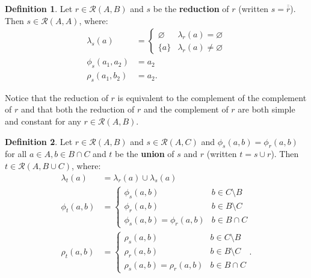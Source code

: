 \documentclass{article}
\theoremstyle{definition}
\newtheorem{definition}{Definition}[subsection]
\theoremstyle{plain}
\def\rule{\mathcal{R}}
\begin{document}
\begin{definition}
  Let $ r \in \rule (A, B) $
  and $ s $ be the \textbf{reduction} of $ r $
  (written $ s = \overline{\overline{r}} $).
  Then $ s \in \rule (A, A) $, where:
  \begin{align}
    \lambda_s (a)    & = \begin{cases}
                           \varnothing & \lambda_r (a) = \varnothing \\
                           \{ a \}     & \lambda_r (a) \neq \varnothing
                         \end{cases} \\
       \phi_s (a_1, a_2) & = a_2 \\
       \rho_s (a_1, b_2) & = a_2.
  \end{align}
\end{definition}

Notice that the reduction of $ r $ is equivalent to the complement of the complement of $ r $
and that both the reduction of $ r $ and the complement of $ r $ are both simple and constant for any $ r \in \rule (A, B) $.

\begin{definition}
  Let $ r \in \rule (A, B) $
  and $ s \in \rule (A, C) $
  and $ \phi_s (a, b) = \phi_r (a, b) $
  for all $ a \in A, b \in B \cap C $
  and $ t $ be the \textbf{union} of $ s $ and $ r $
  (written $ t = s \cup r $).
  Then $ t \in \rule (A, B \cup C) $, where:
  \begin{align}
    \lambda_t (a)    & = \lambda_r (a) \cup \lambda_s (a) \\
       \phi_t (a, b) & = \begin {cases}
                           \phi_s (a, b)                 & b \in C \setminus B \\
                           \phi_r (a, b)                 & b \in B \setminus C \\
                           \phi_s (a, b) = \phi_r (a, b) & b \in B \cap C
                         \end{cases} \\
        \rho_t (a, b) & = \begin {cases}
                           \rho_s (a, b)                 & b \in C \setminus B \\
                           \rho_r (a, b)                 & b \in B \setminus C \\
                           \rho_s (a, b) = \rho_r (a, b) & b \in B \cap C
                         \end{cases}. 
  \end{align}
\end{definition}
\end{document}
